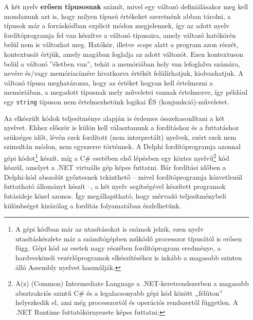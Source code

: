 \documentclass[tocnopagenum]{thesis-ekf}
\begin{document}
	A két nyelv \textbf{erősen típusosnak} számít, mivel egy változó definiálásakor meg kell mondanunk azt is, hogy milyen típusú értékeket szeretnénk abban tárolni, a típusok már a forráskódban explicit módon megjelennek, így az adott nyelv fordítóprogramja fel van készítve a változó típusaira, amely változó hatókörén belül nem is változhat meg. Hatókör, illetve \textit{scope} alatt a program azon részét, kontextusát értjük, amely magában foglalja az adott változót. Ezen kontextuson belül a változó ''életben van'', tehát a memóriában hely van lefoglalva számára, nevére és/vagy memóriacímére hivatkozva értékét felülírhatjuk, kiolvashatjuk. A változó típusa meghatározza, hogy az értéket hogyan kell értelmezni a memóriában, a megadott típusnak mely műveletei vannak értelmezve, így például egy \verb|string| típuson nem értelmezhetünk logikai ÉS (konjunkció)-műveletet.
	
	Az elkészült kódok teljesítménye alapján is érdemes összehasonlítani a két nyelvet. Ehhez először is külön kell választanunk a fordításhoz és a futtatáshoz szükséges időt, lévén ezek fordított (nem interpretált) nyelvek, ezért ezek nem szimultán módon, nem egyszerre történnek. A Delphi fordítóprogramja azonnal gépi kódot\footnote{A gépi kódban már az utasításokat is számok jelzik, ezen nyelv utasításkészlete már a számítógépben működő processzor típusától is erősen függ. Gépi kód az esetek nagy részében fordítóprogram eredménye, a hardverközeli vezérlőprogramok elkészítéséhez is inkább a magasabb szinten álló Assembly nyelvet használják.} készít, míg a C\# esetében első lépésben egy köztes nyelvű\footnote{A(z) (Common) Intermediate Language a .NET-keretrendszerben a magasabb absztrakciós szintű C\# és a legalacsonyabb gépi kód között ,,félúton'' helyezkedik el, ami még processzortól és operációs rendszertől független. A .NET Runtime futtatókörnyezete képes futtatni.} kód készül, amelyet a .NET virtuális gép képes futtatni. Bár fordítási időben a Delphi-kód abszolút győztesnek tekinthető -- mivel fordítóprogramja közvetlenül futtatható állományt készít --, a két nyelv segítségével készített programok futásideje közel azonos. Így megállapítható, hogy mérvadó teljesítménybeli különbséget kizárólag a fordítás folyamatában észlelhetünk.
	
\end{document}
